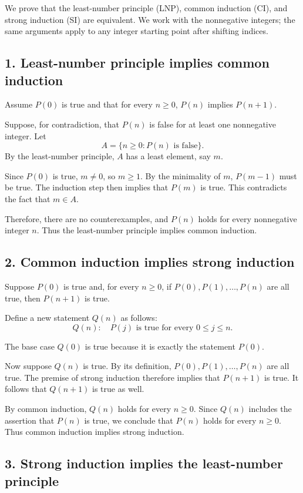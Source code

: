 \documentclass[11pt]{article}
\begin{document}
We prove that the least-number principle (LNP), common
induction (CI), and strong induction (SI) are equivalent.
We work with the nonnegative integers; the same arguments
apply to any integer starting point after shifting indices.

\subsection*{1. Least-number principle implies common induction}

Assume $P(0)$ is true and that for every $n\geq0$,
$P(n)$ implies $P(n+1)$.

Suppose, for contradiction, that $P(n)$ is false for
at least one nonnegative integer. Let
\[
A=\{n\geq0:P(n)\text{ is false}\}.
\]
By the least-number principle, $A$ has a least element,
say $m$.

Since $P(0)$ is true, $m\neq0$, so $m\geq1$.
By the minimality of $m$, $P(m-1)$ must be true.
The induction step then implies that $P(m)$ is true.
This contradicts the fact that $m\in A$.

Therefore, there are no counterexamples, and $P(n)$
holds for every nonnegative integer $n$. Thus the
least-number principle implies common induction.

\subsection*{2. Common induction implies strong induction}

Suppose $P(0)$ is true and, for every $n\geq0$, if
$P(0),P(1),\ldots,P(n)$ are all true, then $P(n+1)$
is true.

Define a new statement $Q(n)$ as follows:
\[
Q(n):\quad P(j)\text{ is true for every }0\leq j\leq n.
\]

The base case $Q(0)$ is true because it is exactly
the statement $P(0)$.

Now suppose $Q(n)$ is true. By its definition,
$P(0),P(1),\ldots,P(n)$ are all true. The premise of
strong induction therefore implies that $P(n+1)$ is
true. It follows that $Q(n+1)$ is true as well.

By common induction, $Q(n)$ holds for every $n\geq0$.
Since $Q(n)$ includes the assertion that $P(n)$ is true,
we conclude that $P(n)$ holds for every $n\geq0$.
Thus common induction implies strong induction.

\subsection*{3. Strong induction implies the least-number principle}
\end{document}
